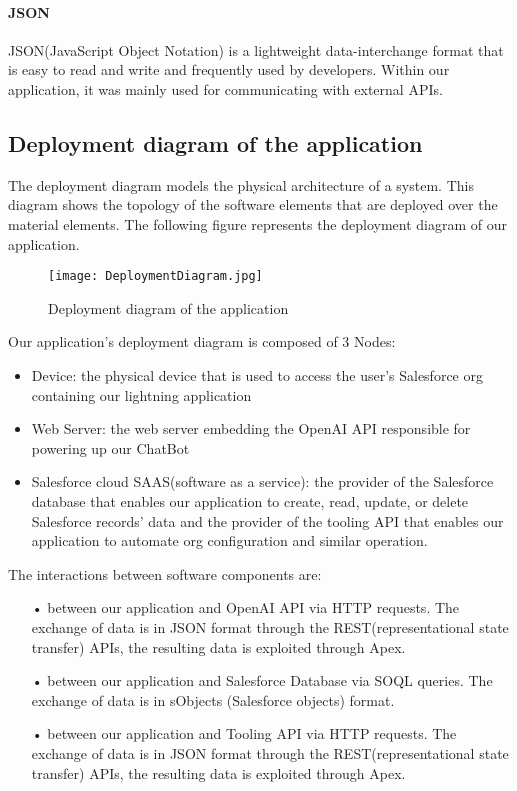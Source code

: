 \paragraph*{JSON}
JSON(JavaScript Object Notation) is a lightweight data-interchange format that is easy to read and write and
frequently used by developers. Within our application, it was mainly used for communicating with external APIs. 
\subsection{Deployment diagram of the application}
The deployment diagram models the physical architecture of a system.
This diagram shows the topology of the software elements that are deployed over the material elements.
The following figure represents the deployment diagram of our application.
\begin{figure}[H]%
    \center   
    \texttt{[image: DeploymentDiagram.jpg]}
    \caption{Deployment diagram of the application}
\end{figure}
Our application's deployment diagram is composed of 3 Nodes:
\begin{itemize}
\item Device: the physical device that is used to access the user's Salesforce org containing our lightning application
\item Web Server: the web server embedding the OpenAI API responsible for powering up our ChatBot 
\item Salesforce cloud SAAS(software as a service): the provider of the Salesforce database that enables our application to create, read, update, or delete Salesforce records' data and the provider of the tooling API that enables our application to automate org configuration and similar operation.  
\end{itemize}
The interactions between software components are:
\begin{itemize}
\item[•] between our application and OpenAI API via HTTP requests. The exchange of data is in JSON format through the
REST(representational state transfer) APIs, the resulting data is exploited through Apex.
\item[•] between our application and Salesforce Database via SOQL queries. The exchange of data is in sObjects (Salesforce objects) format.
\item[•] between our application and Tooling API via HTTP requests. The exchange of data is in JSON format through the
REST(representational state transfer) APIs, the resulting data is exploited through Apex.

\end{itemize}

